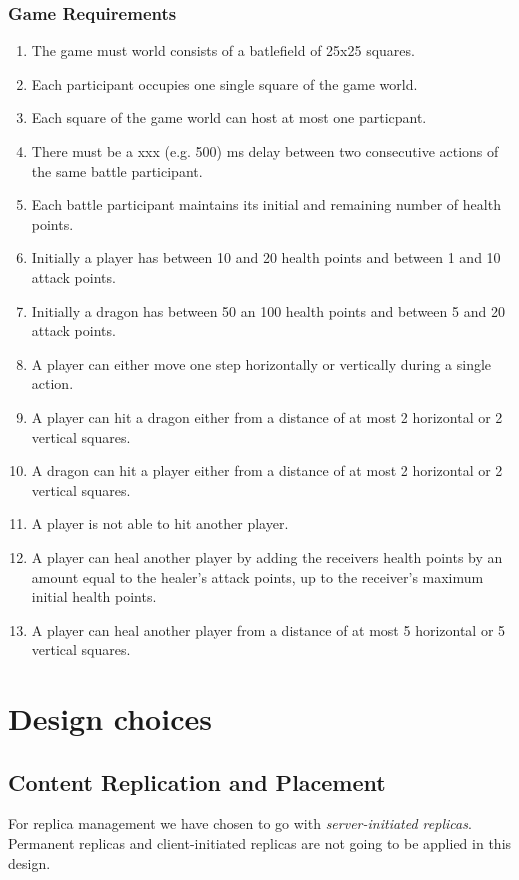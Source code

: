 \documentclass{article}
\begin{document}
\subsubsection{Game Requirements}
\begin{enumerate}
	\item The game must world consists of a batlefield of 25x25 squares.
	\item Each participant occupies one single  square of the game world.
	\item Each square of the game world can host at most one particpant.
	\item There must be a xxx (e.g. 500) ms delay between two consecutive actions of the same battle participant.
	\item Each battle participant maintains its initial and remaining number of health points.
	\item Initially a player has between 10 and 20 health points and between 1 and 10 attack points.
	\item Initially a dragon has between 50 an 100 health points and between 5 and 20 attack points.
	\item A player can either move one step horizontally or vertically during a single action.
	\item A player can hit a dragon either from a distance of at most 2 horizontal or 2 vertical squares.
	\item A dragon can hit a player either from a distance of at most 2 horizontal or 2 vertical squares.
	\item A player is not able to hit another player.
	\item A player can heal another player by adding the receivers health points by an amount equal to the healer's attack points, up to the receiver's maximum initial health points. 
	\item A player can heal another player from a distance of at most 5 horizontal or 5 vertical squares.
\end{enumerate}

\section{Design choices}
\subsection{Content Replication and Placement}
For replica management we have chosen to go with \emph{server-initiated replicas}. Permanent replicas and client-initiated replicas are not going to be applied in this design. 
\end{document}
